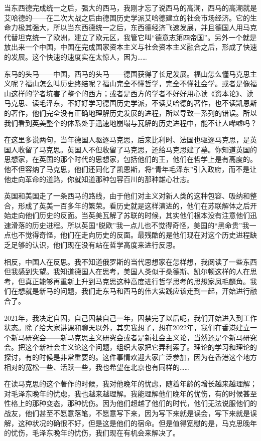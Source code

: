 \documentclass[UTF8, 12pt, a4paper]{ctexrep}
\begin{document}
当东西德完成统一之后，强大的西马，我刚才忘了说西马的高潮，西马的高潮就是艾哈德的——在二次大战之后由德国历史学派艾哈德建立的社会市场经济。它的生命力极其强大，所以当东西德统一之后，东西德经济飞速发展，并且德国人用马克代替坦克统一了欧洲，建立了欧元区，我管它叫“德意志第四帝国”。另外一个就是放出来一个中国，中国在完成国家资本主义与社会资本主义融合之后，形成了快速的发展。这个快速的速度实在太惊人，因为……

东马的头马——中国，西马的头马——德国获得了长足发展。福山怎么懂马克思主义呢？福山怎么叫历史终结呢？福山完全不懂哲学，完全不懂社会学。或者是像福山这样的学者坑害了整个的西方；或者是西方的学者不好好用心读《资本论》、读马克思、读毛泽东，不好好学习德国历史学派，不读艾哈德的著作，也不读凯恩斯的著作，他们完全没有正确地理解历史发展的进程，所以导致一系列的错误。所以我们看到英美整个的体系处于迅速地崩塌与瓦解的历史进程中，能不让人唏嘘吗？

在这里多说两句，当年德国人驱逐马克思，后来比利时、法国也驱逐马克思，是英国人收留了马克思。英国人不但收留了马克思，还给马克思建了墓。你知道英国的思想家，在英国的那个时代的思想家，包括他们的王，他们在哲学上是有高度的。他不但容纳了马克思，他们还同化了凯恩斯，将“青年毛泽东”引入政府，而不是让他走向革命的道路，你就知道那种包容百川的那种雄心壮志。

英国和美国走了一条西马的路线，由于他们对主义对新人类的这种包容、吸纳和整合，形成了英美一百多年的繁荣。看历史就是这样演进的，他们在苏联解体之后开始走向他们历史的反面。当英美瓦解了苏联的时候，其实他们根本没有注意他们迅速滑落的历史进程。所以英国“脱欧”我一点儿也不觉得奇怪，美国的“黑命贵”我一点也不觉得奇怪，他们在走向历史的反面。最残酷的是他们现在对这个历史进程缺乏足够的认识，他们现在没有站在哲学高度来进行反思。

相反，中国人在反思。我不知道俄罗斯的当代思想家在怎样想，我阅读了一些东西但我感到失望。我知道德国人在思考，美国人类似于桑德斯、凯尔顿这样的人在思考，但真正能够再重新上升到马克思这种高度进行哲学思考的思想家凤毛麟角。我们在想就是新马的问题，我们走东马和西马的伟大实践应该走到一起，开始进行融合了。

2021年，我决定自囚，自己囚禁自己一年，囚禁完了以后呢，我们开始进入到工作状态。除了给大家讲课和聊天以外，其实我想了，想在2022年，我们在香港建立一个新马研究会——新马克思主义研究会或者是新社会主义论，当然还是个新马研究会。把这个新社会主义论这个问题，组织大家把它弄利索了。理论的学习和理论的探讨，有的时候是非常重要的。这件事情欢迎大家广泛参加，因为在香港这个地方相对的宽松一些、活跃一些，我也希望在北京也有同样的……

在读马克思的这个著作的时候，我对他晚年的忧虑，随着年龄的增长越来越理解；对毛泽东晚年的忧虑，我也越来越理解。我能理解他们晚年的忧伤，有的时候甚至性格上的那种变态，那种忧伤。因为他们超越了他们的时代，他们无法说服他们的战友，他们甚至不愿意落笔，不愿意写下来，因为写下来就是误会，写下来就是误解，这种状况的确很不好，但是这是他们的宿命。但是值得宽慰的是，马克思晚年的忧伤，毛泽东晚年的忧伤，我们现在有机会来解决了。
\end{document}
